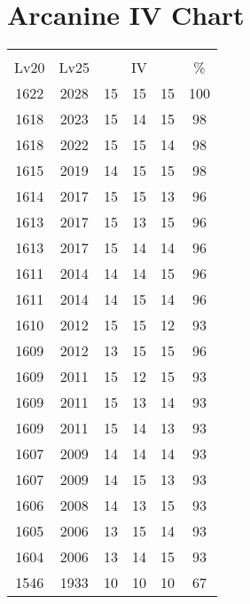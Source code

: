 \documentclass{article}%
\begin{document}
%
\normalsize%
\section{Arcanine IV Chart}%
\label{sec:Arcanine IV Chart}%
\renewcommand{\arraystretch}{1.5}%
\begin{tabular}{|c|c|c|c|c|c|}%
\hline%
\multicolumn{6}{|c|}{\textcolor{white}{ 
\linebreak{Arcanine}
}%
\cellcolor{black}}\\%
\multicolumn{1}{|c}{Lv20}&\multicolumn{1}{c|}{Lv25}&\multicolumn{3}{c|}{IV}&\multicolumn{1}{|c|}{\%}\\%
\hline%
\rowcolor{color100}%
1622&2028&15&15&15&100\\%
\hline%
\rowcolor{color98}%
1618&2023&15&14&15&98\\%
\hline%
\rowcolor{color98}%
1618&2022&15&15&14&98\\%
\hline%
\rowcolor{color98}%
1615&2019&14&15&15&98\\%
\hline%
\rowcolor{color96}%
1614&2017&15&15&13&96\\%
\hline%
\rowcolor{color96}%
1613&2017&15&13&15&96\\%
\hline%
\rowcolor{color96}%
1613&2017&15&14&14&96\\%
\hline%
\rowcolor{color96}%
1611&2014&14&14&15&96\\%
\hline%
\rowcolor{color96}%
1611&2014&14&15&14&96\\%
\hline%
\rowcolor{color93}%
1610&2012&15&15&12&93\\%
\hline%
\rowcolor{color96}%
1609&2012&13&15&15&96\\%
\hline%
\rowcolor{color93}%
1609&2011&15&12&15&93\\%
\hline%
\rowcolor{color93}%
1609&2011&15&13&14&93\\%
\hline%
\rowcolor{color93}%
1609&2011&15&14&13&93\\%
\hline%
\rowcolor{color93}%
1607&2009&14&14&14&93\\%
\hline%
\rowcolor{color93}%
1607&2009&14&15&13&93\\%
\hline%
\rowcolor{color93}%
1606&2008&14&13&15&93\\%
\hline%
\rowcolor{color93}%
1605&2006&13&15&14&93\\%
\hline%
\rowcolor{color93}%
1604&2006&13&14&15&93\\%
\hline%
\rowcolor{color91}%
1546&1933&10&10&10&67\\%
\end{tabular}

%
\end{document}

